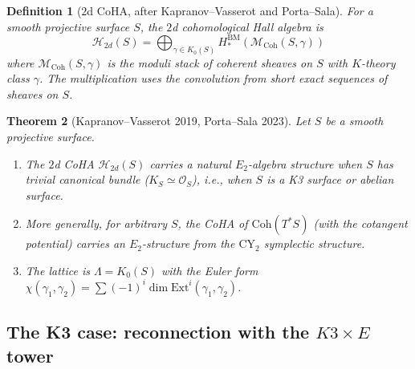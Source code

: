 \documentclass[11pt]{article}
\theoremstyle{garamondthm}
\newtheorem{theorem}{Theorem}[section]
\theoremstyle{garamonddef}
\newtheorem{definition}[theorem]{Definition}
\theoremstyle{garamondrem}
\newcommand{\Coh}{\mathrm{Coh}}
\newcommand{\CY}{\mathrm{CY}}
\newcommand{\Etwo}{E_2}
\newcommand{\Ext}{\mathrm{Ext}}
\newcommand{\cH}{\mathcal{H}}
\newcommand{\cM}{\mathcal{M}}
\newcommand{\cO}{\mathcal{O}}
\begin{document}
\begin{definition}[$2$d CoHA, after Kapranov--Vasserot and Porta--Sala]
\label{def:2d-coha}
For a smooth projective surface $S$, the \emph{$2$d cohomological Hall algebra} is
\[
 \cH_{2d}(S) = \bigoplus_{\gamma \in K_0(S)} H^{\mathrm{BM}}_*(\cM_{\Coh}(S, \gamma))
\]
where $\cM_{\Coh}(S, \gamma)$ is the moduli stack of coherent sheaves on $S$ with $K$-theory class $\gamma$. The multiplication uses the convolution from short exact sequences of sheaves on $S$.
\end{definition}

\begin{theorem}[Kapranov--Vasserot 2019, Porta--Sala 2023]
\label{thm:kv-ps}
Let $S$ be a smooth projective surface.
\begin{enumerate}[label=(\roman*)]
 \item The $2$d CoHA $\cH_{2d}(S)$ carries a natural $\Etwo$-algebra structure when $S$ has trivial canonical bundle ($K_S \simeq \cO_S$), i.e., when $S$ is a K3 surface or abelian surface.
 \item More generally, for arbitrary $S$, the CoHA of $\Coh(T^*S)$ (with the cotangent potential) carries an $\Etwo$-structure from the $\CY_2$ symplectic structure.
 \item The lattice is $\Lambda = K_0(S)$ with the Euler form $\chi(\gamma_1, \gamma_2) = \sum (-1)^i \dim \Ext^i(\gamma_1, \gamma_2)$.
\end{enumerate}
\end{theorem}

\subsection{The K3 case: reconnection with the $K3 \times E$ tower}
\label{ssec:k3-reconnection}
\end{document}
